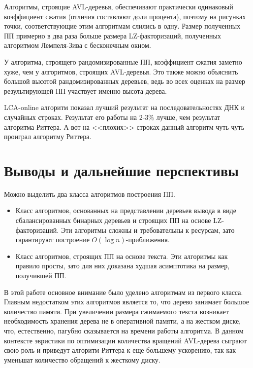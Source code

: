 \documentclass[14pt]{article}
\begin{document}
Алгоритмы, строящие AVL-деревья, обеспечивают практически одинаковый коэффициент сжатия (отличия составляют доли процента), поэтому
на рисунках точки, соответствующие этим алгоритмам слились в одну. Размер полученных ПП примерно в два раза больше
размера LZ-факторизаций, полученных алгоритмом Лемпеля-Зива с бесконечным окном.

У алгоритма, строящего рандомизированные ПП, коэффициент сжатия заметно хуже, чем у алгоритмов, строящих AVL-деревья. Это также
можно объяснить большой высотой рандомизированных деревьев, ведь во всех оценках на размер результирующей ПП участвует именно высота дерева.

LCA-online алгоритм показал лучший результат на последовательностях ДНК и случайных строках. Результат его работы на 2-3\% лучше,
чем результат алгоритма Риттера. А вот на <<плохих>> строках данный алгоритм чуть-чуть проиграл алгоритму Риттера.

\drawAllCharts{}

\newpage

\section{Выводы и дальнейшие перспективы}

Можно выделить два класса алгоритмов построения ПП.
\begin{itemize}
	\item Класс алгоритмов, основанных на представлении деревьев вывода в виде сбалансированных бинарных деревьев
	и строящих ПП на основе LZ-факторизаций. Эти алгоритмы сложны и требовательны к ресурсам, зато гарантируют
	построение $O(\log n)$-приближения.
	\item Класс алгоритмов, строящих ПП на основе текста. Эти алгоритмы как правило просты, зато для них
	доказана худшая асимптотика на размер, получившей ПП.
\end{itemize}

В этой работе основное внимание было уделено алгоритмам из первого класса. Главным недостатком этих алгоритмов является то,
что дерево занимает большое количество памяти. При увеличении размера сжимаемого текста возникает необходимость хранения дерева 
не в оперативной памяти, а на жестком диске, что, естественно, пагубно сказывается на времени работы алгоритма. В данном контексте
эвристики по оптимизации количества вращений AVL-дерева сыграют свою роль и приведут алгоритм Риттера к еще большему ускорению,
так как уменьшат количество обращений к жесткому диску.
\end{document}
